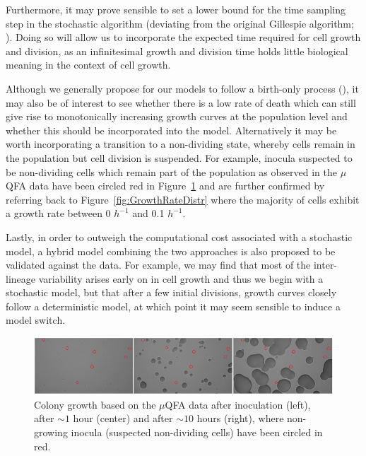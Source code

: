 \documentclass{bioinfo}
\begin{document}
Furthermore, it may prove sensible to set a lower bound for the time sampling step in the stochastic algorithm (deviating from the original Gillespie algorithm; \citealp{Gillespie77}). Doing so will allow us to incorporate the expected time required for cell growth and division, as an infinitesimal  growth and division time holds little biological meaning in the context of cell growth. 

Although we generally propose for our models to follow a birth-only process (\citealp{Bailey64}), it may also be of interest to see whether there is a low rate of death which can still give rise to monotonically increasing growth curves at the population level and whether this should be incorporated into the model. Alternatively it may be worth incorporating a transition to a non-dividing state, whereby cells remain in the population but cell division is suspended. For example, inocula suspected to be non-dividing cells which remain part of the population as observed in the $\mu$QFA data have been circled  red in Figure~\ref{fig:NonDividingCells} and are further confirmed by referring back to Figure~\ref{fig:GrowthRateDistr} where the majority of cells exhibit a growth rate between 0 $h^{-1}$ and 0.1 $h^{-1}$. 

Lastly, in order to outweigh the computational cost associated with a stochastic model, a hybrid model combining the two approaches is also proposed to be validated against the data. For example, we may find that most of the inter-lineage variability arises early on in cell growth and thus we begin with a stochastic model, but that after a few initial divisions, growth curves closely follow a deterministic model, at which point it may seem sensible to induce a model switch. 

\begin{figure}[ht!]
\centering
\includegraphics[width=1\linewidth]{NonDividing3Pics.png}
\caption{Colony growth based on the $\mu$QFA data after inoculation (left), after $\sim 1$ hour (center) and after $\sim 10$ hours (right), where non-growing inocula (suspected non-dividing cells) have been circled in red.}
\label{fig:NonDividingCells}
\vspace{-2.5em}
\end{figure}
\end{document}
